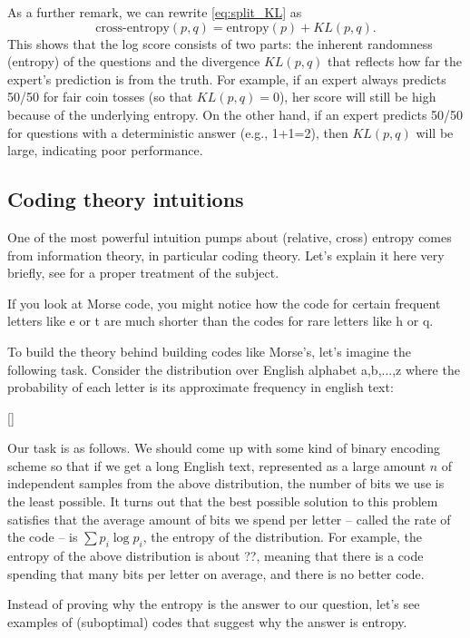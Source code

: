 \documentclass{article}
\begin{document}
As a further remark, we can rewrite \cref{eq:split_KL} as
\[
\text{cross-entropy}(p,q)=\text{entropy}(p)+KL(p,q).
\]
This shows that the log score consists of two parts: the inherent randomness (entropy) of the questions and the divergence \(KL(p,q)\) that reflects how far the expert's prediction is from the truth. For example, if an expert always predicts 50/50 for fair coin tosses (so that \(KL(p,q)=0\)), her score will still be high because of the underlying entropy. On the other hand, if an expert predicts 50/50 for questions with a deterministic answer (e.g., 1+1=2), then \(KL(p,q)\) will be large, indicating poor performance.

\subsection{Coding theory intuitions}

One of the most powerful intuition pumps about (relative, cross) entropy comes from information theory, in particular coding theory. Let's explain it here very briefly, see \cite{?} for a proper treatment of the subject. 

If you look at Morse code, you might notice how the code for certain frequent letters like e or t are much shorter than the codes for rare letters like h or q. 

To build the theory behind building codes like Morse's, let's imagine the following task. Consider the distribution over English alphabet a,b,...,z where the probability of each letter is its approximate frequency in english text: 

[]

Our task is as follows. We should come up with some kind of binary encoding scheme so that if we get a long English text, represented as a large amount $n$ of independent samples from the above distribution, the number of bits we use is the least possible. 
It turns out that the best possible solution to this problem satisfies that the average amount of bits we spend per letter -- called the rate of the code -- is $\sum p_i \log p_i$, the entropy of the distribution. For example, the entropy of the above distribution is about ??, meaning that there is a code spending that many bits per letter on average, and there is no better code. 

Instead of proving why the entropy is the answer to our question, let's see examples of (suboptimal) codes that suggest why the answer is entropy. 
\end{document}
